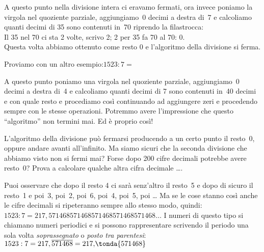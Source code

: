 A questo punto nella divisione intera ci eravamo fermati, 
ora invece poniamo la virgola nel quoziente parziale,
aggiungiamo~0 decimi a destra di~7 e calcoliamo quanti decimi di 35 sono 
contenuti in~70 riprendo la filastrocca: \\
Il 35 nel 70 ci sta 2 volte, scrivo 2; 2 per 35 fa 70 al 70: 0.\\
Questa volta abbiamo ottenuto come resto 0 e l'algoritmo della divisione si 
ferma.

Proviamo con un altro esempio:\quad \(1523 : 7 =\)



A questo punto poniamo una virgola nel quoziente parziale,
aggiungiamo~0 decimi a destra di~4 e calcoliamo quanti decimi di 7 sono 
contenuti in~40 decimi e con quale resto e procediamo così continuando ad 
aggiungere zeri e procedendo sempre con le stesse operazioni.
Potremmo avere l'impressione che questo ``algoritmo'' non termini mai. 
Ed è proprio così!

L'algoritmo della divisione può fermarsi producendo a un certo punto il 
resto~0, oppure andare avanti all'infinito. Ma siamo sicuri che la seconda 
divisione che abbiamo visto non si fermi mai? Forse dopo 200 cifre decimali 
potrebbe avere resto~0? Prova a calcolare qualche altra cifra decimale \dots.

Puoi osservare che dopo il resto 4 ci sarà senz'altro il resto~5 e dopo di 
sicuro il resto~1 e poi~3, poi~2, poi~6, poi~4, poi~5, poi \dots
Ma se le cose stanno così anche le cifre decimali si ripeteranno sempre 
allo stesso modo, quindi: \\
\(1523 : 7 = 217,571468571468571468571468571468\ldots\)
I numeri di questo tipo si chiamano numeri periodici e si possono 
rappresentare scrivendo il periodo una sola volta \emph{soprassegnato} o 
\emph{posto tra parentesi}: \quad 
\(1523 : 7 = 217,\overline{571468} = 217,\!\tonda{571468}\)

